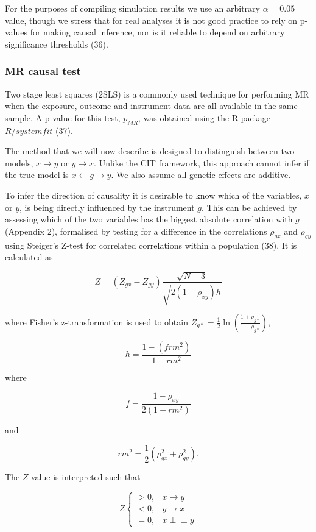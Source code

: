 \documentclass[]{article}
\begin{document}
For the purposes of compiling simulation results we use an arbitrary
\(\alpha = 0.05\) value, though we stress that for real analyses it is
not good practice to rely on p-values for making causal inference, nor
is it reliable to depend on arbitrary significance thresholds (36).

\subsubsection{MR causal test}\label{mr-causal-test}

Two stage least squares (2SLS) is a commonly used technique for
performing MR when the exposure, outcome and instrument data are all
available in the same sample. A p-value for this test, \(p_{MR}\), was
obtained using the R package \(R/systemfit\) (37).

The method that we will now describe is designed to distinguish between
two models, \(x \rightarrow y\) or \(y \rightarrow x\). Unlike the CIT
framework, this approach cannot infer if the true model is
\(x \leftarrow g \rightarrow y\). We also assume all genetic effects are
additive.

To infer the direction of causality it is desirable to know which of the
variables, \(x\) or \(y\), is being directly influenced by the
instrument \(g\). This can be achieved by assessing which of the two
variables has the biggest absolute correlation with \(g\) (Appendix 2),
formalised by testing for a difference in the correlations \(\rho_{gx}\)
and \(\rho_{gy}\) using Steiger's Z-test for correlated correlations
within a population (38). It is calculated as

\[
Z = (Z_{gx} - Z_{gy}) \frac{\sqrt{N-3}}{\sqrt{2(1-\rho_{xy})h}}
\]

where Fisher's z-transformation is used to obtain
\(Z_{g*} = \frac{1}{2} \ln \left ( \frac{1+\rho_{g*}}{1-\rho_{g*}} \right )\),

\[
h = \frac{1 - (frm^2)} {1 - rm^2}
\]

where

\[
f = \frac{1 - \rho_{xy}}{2(1 - rm^2)}
\]

and

\[
rm^2 = \frac{1}{2}(\rho_{gx}^2 + \rho_{gy}^2).
\]

The \(Z\) value is interpreted such that

\[
Z \left\{
\begin{array}{ll}
> 0, & x \to y\\
< 0, & y \to x\\
= 0, & x \perp\!\!\!\perp y 
\end{array} \right.
\]
\end{document}

